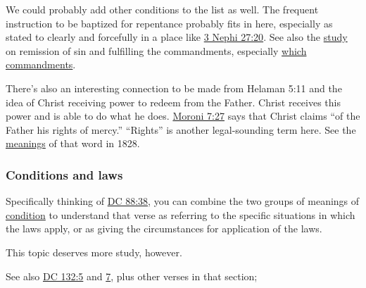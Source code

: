 		We could probably add other conditions to the list as well. The frequent instruction to be baptized for repentance probably fits in here, especially as stated to clearly and forcefully in a place like \hyperref[3NEPHI-27-20]{3 Nephi 27:20}. See also the \hyperref[REMISSION-commandments]{study} on remission of sin and fulfilling the commandments, especially \hyperref[REMISSION-commandments-which]{which commandments}.
		
		There's also an interesting connection to be made from Helaman 5:11 and the idea of Christ receiving power to redeem from the Father. Christ receives this power and is able to do what he does. \hyperref[MORONI-7-27]{Moroni 7:27} says that Christ claims ``of the Father his rights of mercy.'' ``Rights'' is another legal-sounding term here. See the \hyperref[RIGHT-NOUN-1828]{meanings} of that word in 1828.
	
	\subsubsection{Conditions and laws}
		\label{CONDITION-laws}
		
		Specifically thinking of \hyperref[DC88-38]{DC 88:38}, you can combine the two groups of meanings of \hyperref[CONDITION-1828]{condition} to understand that verse as referring to the specific situations in which the laws apply, or as giving the circumstances for application of the laws. 
		
		This topic deserves more study, however.
		
		See also \hyperref[DC132-5]{DC 132:5} and \hyperref[DC132-7]{7}, plus other verses in that section;  